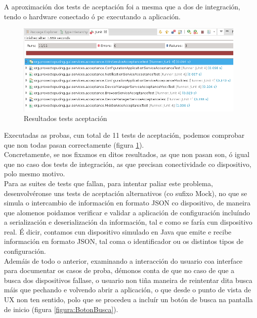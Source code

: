  A aproximación dos tests de aceptación foi a mesma que a dos de integración,
 tendo o hardware conectado ó pc executando a aplicación. \\
 
 \begin{figure}[htbp]
  \centering
  \includegraphics[scale=0.6,keepaspectratio=true]{./imagenes/resultados-tests-aceptacion.png}
  \caption{Resultados tests aceptación}
  \label{figura:ResultadosTestAceptacion}
 \end{figure}
  
 Executadas as probas, cun total de 11 tests de aceptación, podemos comprobar
 que non todas pasan correctamente
 (figura \ref{figura:ResultadosTestAceptacion}). \\
 
 Concretamente, se nos fixamos en ditos resultados, as que non pasan son, ó
 igual que no caso dos tests de integración, as que precisan conectividade co
 dispositivo, polo mesmo motivo. \\
 
 Para as suites de tests que fallan, para intentar paliar este problema,
 desenvolvéronse uns tests de aceptación alternativos (co sufixo Mock), no que
 se simula o intercambio de información en formato JSON co dispositivo, de
 maneira que alomenos poidamos verificar e validar a aplicación de configuración
 incluíndo a serialización e deserialización da información, tal e como se faría
 cun dispositivo real. É dicir, contamos cun dispositivo simulado en Java que
 emite e recibe información en formato JSON, tal coma o identificador ou os
 distintos tipos de configuración. \\
 
 Ademáis de todo o anterior, examinando a interacción do usuario coa interface
 para documentar os casos de proba, démonos conta de que no caso de que a busca
 dos dispositivos fallase, o usuario non tiña maneira de reintentar dita busca
 máis que pechando e volvendo abrir a aplicación, o que desde o punto de vista
 de UX non ten sentido, polo que se procedeu a incluír un botón de busca na
 pantalla de inicio (figura \ref{figura:BotonBusca}).
 
